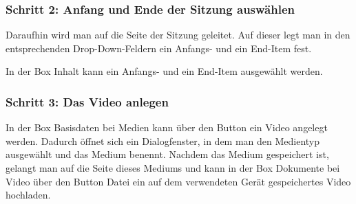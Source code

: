 \documentclass[parskip=off,index=totocnumbered]{scrartcl}
\newenvironment{rückkeinstück}
	{\begin{adjustwidth}{0cm}{0cm}\footnotesize \singlespace \centering} 
	{\end{adjustwidth} \onehalfspacing}
\begin{document}
            
\subsubsection*{Schritt 2: Anfang und Ende der Sitzung auswählen}
Daraufhin wird man auf die Seite der Sitzung geleitet. Auf dieser legt man in den entsprechenden Drop-Down-Feldern ein Anfangs- und ein End-Item fest.\\	
\noindent \begin{minipage}{\textwidth}
    \vspace{0.6cm}
    \begin{rückkeinstück}
        In der Box \textsf{Inhalt} kann ein Anfangs- und ein End-Item ausgewählt werden.
    \end{rückkeinstück}
\end{minipage}             


\subsubsection*{Schritt 3: Das Video anlegen}
In der Box \textsf{Basisdaten} bei \textsf{Medien} kann über den Button \add ein Video angelegt werden. Dadurch öffnet sich ein Dialogfenster, in dem man den Medientyp ausgewählt und das Medium benennt. Nachdem das Medium gespeichert ist, gelangt man auf die Seite dieses Mediums und kann in der Box \textsf{Dokumente} bei \textsf{Video} über den Button \colorbox{LightSteelBlue3!60!}{\textsf{Datei}} ein auf dem verwendeten Gerät gespeichertes Video hochladen. 
   
\end{document}

